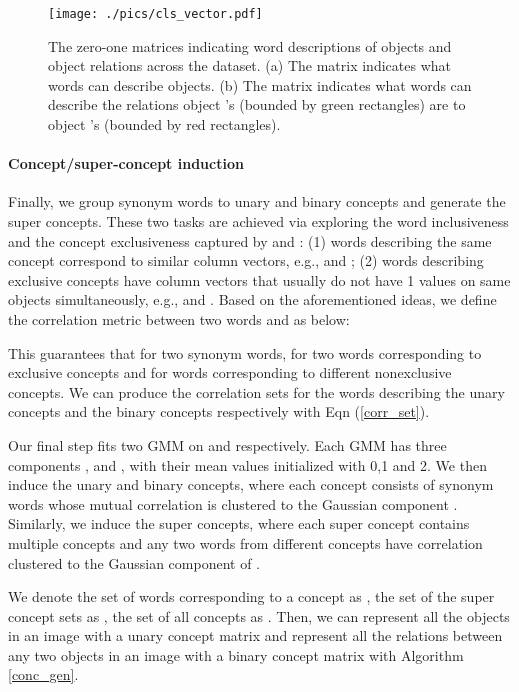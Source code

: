 \documentclass[final]{cvpr}
\begin{document}
\begin{figure}
\centering
\texttt{[image: ./pics/cls\_vector.pdf]}
\caption{The zero-one matrices indicating word descriptions of objects and object relations across the dataset. (a) The matrix  indicates what words can describe objects. (b) The matrix  indicates what words can describe the relations object 's (bounded by green rectangles) are to object 's (bounded by red rectangles).}
\label{cls_vector}
\vspace{-3mm}
\end{figure}

\vspace{-3mm}
\paragraph{Concept/super-concept induction}
Finally, we group synonym words to unary and binary concepts and generate the super concepts. 
These two tasks are achieved via exploring the word inclusiveness and the concept exclusiveness captured by  and :
(1) words describing the same concept correspond to similar column vectors, e.g.,  and ;
(2) words describing exclusive concepts have column vectors that usually do not have 1 values on same objects simultaneously, e.g.,  and . 
Based on the aforementioned ideas, we define the correlation metric between two words  and  as below:

This guarantees that  for two synonym words,  for two words corresponding to exclusive concepts and  for words corresponding to different nonexclusive concepts. We can produce the correlation sets for the words describing the unary concepts and the binary concepts respectively with Eqn (\ref{corr_set}).


Our final step fits two GMM on  and  respectively. Each GMM has three components ,  and , with their mean values initialized with 0,1 and 2. 
We then induce the unary and binary concepts, where each concept consists of synonym words whose mutual correlation is clustered to the Gaussian component . 
Similarly, we induce the super concepts, where each super concept contains multiple concepts and any two words from different concepts have correlation clustered to the Gaussian component of .

We denote the set of words corresponding to a concept  as , the set of the super concept sets as , the set of all concepts as . Then, we can represent all the objects in an image with a unary concept matrix  and represent all the relations between any two objects in an image with a binary concept matrix  with Algorithm \ref{conc_gen}.
\end{document}
